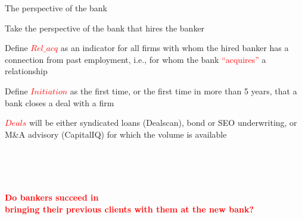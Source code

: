 \documentclass[notes,11pt, aspectratio=169]{beamer}
\newenvironment{wideitemize}{\itemize\addtolength{\itemsep}{10pt}  \setlength\itemsep{.5em}}{\enditemize}
\begin{document}
\begin{frame}{The perspective of the bank}
\begin{wideitemize}
  \item Take the perspective of the bank that hires the banker
  \item Define \textcolor{red}{$Rel\_acq$} as an indicator for all firms with whom the hired banker has a connection from past employment, i.e., for whom the bank \textcolor{red}{``acquires''} a relationship
  \item Define \textcolor{red}{$Initiation$} as the first time, or the first time in more than 5 years, that a bank closes a deal with a firm 
  \item \textcolor{red}{$Deals$} will be either syndicated loans (Dealscan), bond or SEO underwriting, or M\&A advisory (CapitalIQ) for which the volume is available
\end{wideitemize}

\vspace{.3cm}
 { \large ~ \\ ~ \\ ~ \\}
 {
{ \large \begin{center} \textcolor{red}{\textbf{Do bankers succeed in \\ bringing their previous clients with them at the new bank?} } \end{center} } }
\end{frame} 
\end{document}
